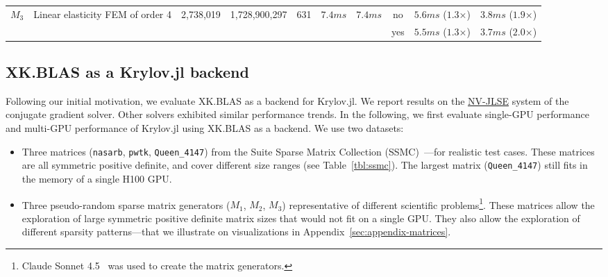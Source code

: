 \documentclass{juliacon}
\DeclareRobustCommand{\arch}[1]{\hyperlink{#1}{#1}}
\begin{document}
\begin{table}[]
{\begin{tabular}{|c|c|ccc|c|cccc|}
\multirow{2}{*}{$M_3$} & \multirow{2}{*}{Linear elasticity FEM of order 4} & \multicolumn{1}{c|}{\multirow{2}{*}{2,738,019}} & \multicolumn{1}{c|}{\multirow{2}{*}{1,728,900,297}} & \multirow{2}{*}{631} & \multirow{2}{*}{$7.4 ms$} & \multicolumn{1}{c|}{\multirow{2}{*}{$7.4 ms$}} & \multicolumn{1}{c|}{no} & \multicolumn{1}{c|}{$5.6 ms$ ($1.3$×)} & $3.8 ms$ ($1.9$×) \\
 &  & \multicolumn{1}{c|}{} & \multicolumn{1}{c|}{} &  &  & \multicolumn{1}{c|}{} & \multicolumn{1}{c|}{yes} & \multicolumn{1}{c|}{$5.5 ms$ ($1.3$×)} & $3.7 ms$ ($2.0$×) \\ \hline
\end{tabular}%
}
\end{table}


\subsection{XK.BLAS as a Krylov.jl backend}

Following our initial motivation, we evaluate XK.BLAS as a backend for Krylov.jl.
We report results on the \arch{NV-JLSE} system of the conjugate gradient solver.
Other solvers exhibited similar performance trends.
%
In the following, we first evaluate single-GPU performance and multi-GPU performance of Krylov.jl using XK.BLAS as a backend.
We use two datasets:
\begin{itemize}
    \item   Three matrices (\texttt{nasarb}, \texttt{pwtk}, \texttt{Queen\_4147}) from the Suite Sparse Matrix Collection (SSMC)~\cite{ssmc}---for realistic test cases. These matrices are all symmetric positive definite, and cover different size ranges (see Table~\ref{tbl:ssmc}). The largest matrix (\texttt{Queen\_4147}) still fits in the memory of a single H100 GPU.
    \item   Three pseudo-random sparse matrix generators ($M_1$, $M_2$, $M_3$) representative of different scientific problems\footnote{Claude Sonnet 4.5~\cite{anthropic-claude-sonnet-45} was used to create the matrix generators.}.
            These matrices allow the exploration of large symmetric positive definite matrix sizes that would not fit on a single GPU.
            They also allow the exploration of different sparsity patterns---that we illustrate on visualizations in Appendix~\ref{sec:appendix-matrices}.
\end{itemize}

\end{document}
